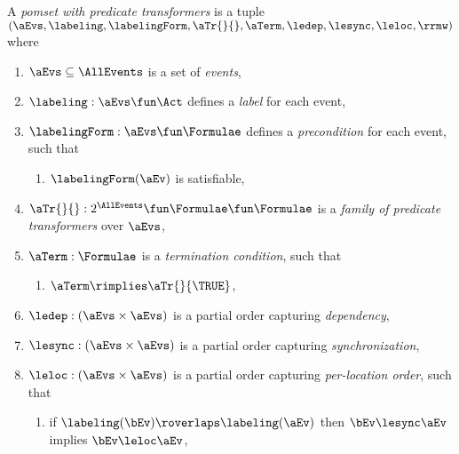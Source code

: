 \begin{definition}
  \label{def:pomset}
  A \emph{pomset with predicate transformers} 
  is a tuple $(\aEvs, \labeling, \labelingForm, \aTr{}{}, {\aTerm}, {\ledep}, {\lesync}, {\leloc}, {\rrmw})$ where
  \begin{enumerate}[,label=(\textsc{m}\arabic*),ref=\textsc{m}\arabic*]
  \item \label{pom-E} 
    $\aEvs\subseteq\AllEvents$ is a set of \emph{events},
  \item \label{pom-lambda} 
    $\labeling: \aEvs \fun \Act$ defines a \emph{label} for each event,
  \item \label{pom-kappa} 
    $\labelingForm:\aEvs\fun\Formulae$ defines a \emph{precondition} for each event, such that
    \begin{enumerate}
    \item \label{pom-kappa-sat}
      $\labelingForm(\aEv)$ is satisfiable,
    \end{enumerate}
  \item \label{pom-tau} 
    $\aTr{}{}:2^{\AllEvents}\fun\Formulae \fun\Formulae$ is a \emph{family of predicate transformers} over $\aEvs$, 
  \item \label{pom-term} 
    $\aTerm:\Formulae$ is a \emph{termination condition}, such that 
    \begin{enumerate}
    \item \label{pom-term-tau}
      $\aTerm\rimplies\aTr{}{\TRUE}$,
    \end{enumerate}
  \item \label{pom-ledep} 
    ${\ledep} : (\aEvs\times\aEvs)$ is a partial order capturing \emph{dependency},
  \item \label{pom-lesync} 
    ${\lesync} : (\aEvs\times\aEvs)$ is a partial order capturing \emph{synchronization}, 
  \item \label{pom-leloc} 
    ${\leloc} : (\aEvs\times\aEvs)$ is a partial order capturing \emph{per-location order}, such that 
    \begin{enumerate}
    \item \label{pom-leloc-lesync}
      if $\labeling(\bEv)\roverlaps\labeling(\aEv)$ 
      then $\bEv\lesync\aEv$ implies $\bEv\leloc\aEv$,      

\end{enumerate}
\end{enumerate}
\end{definition}
